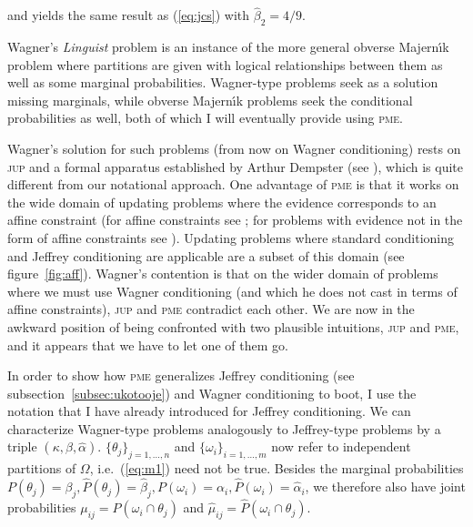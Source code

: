\documentclass[phd,12pt,oneside]{ubcthesis}
\begin{document}
{\noindent}and yields the same result as (\ref{eq:jcs}) with
$\hat{\beta}_{2}=4/9$.

Wagner's \emph{Linguist} problem is an instance of the more general
obverse Majern{\'\i}k problem where partitions are given with logical
relationships between them as well as some marginal probabilities.
Wagner-type problems seek as a solution missing marginals, while
obverse Majern{\'\i}k problems seek the conditional probabilities as
well, both of which I will eventually provide using \textsc{pme}.

Wagner's solution for such problems (from now on Wagner conditioning)
rests on \textsc{jup} and a formal apparatus established by Arthur
Dempster (see ), which is quite different from
our notational approach. One advantage of \textsc{pme} is that it
works on the wide domain of updating problems where the evidence
corresponds to an affine constraint (for affine constraints see
; for problems with evidence not in the form of
affine constraints see ). Updating problems where
standard conditioning and Jeffrey conditioning are applicable are a
subset of this domain (see figure~\ref{fig:aff}). Wagner's contention
is that on the wider domain of problems where we must use Wagner
conditioning (and which he does not cast in terms of affine
constraints), \textsc{jup} and \textsc{pme} contradict each other. We
are now in the awkward position of being confronted with two plausible
intuitions, \textsc{jup} and \textsc{pme}, and it appears that we have
to let one of them go.

In order to show how \textsc{pme} generalizes Jeffrey conditioning
(see subsection~\ref{subsec:ukotooje}) and Wagner conditioning to
boot, I use the notation that I have already introduced for Jeffrey
conditioning. We can characterize Wagner-type problems analogously to
Jeffrey-type problems by a triple $(\kappa,\beta,\hat{\alpha})$.
$\{\theta_{j}\}_{j=1,\ldots,n}$ and $\{\omega_{i}\}_{i=1,\ldots,m}$
now refer to independent partitions of $\Omega$, i.e.\ (\ref{eq:m1})
need not be true. Besides the marginal probabilities
$P(\theta_{j})=\beta_{j}, \hat{P}(\theta_{j})=\hat{\beta}_{j},
P(\omega_{i})=\alpha_{i},\hat{P}(\omega_{i})=\hat{\alpha}_{i}$,
we therefore also have joint probabilities
$\mu_{ij}=P(\omega_{i}\cap\theta_{j})$ and
$\hat{\mu}_{ij}=\hat{P}(\omega_{i}\cap\theta_{j})$.
\end{document}
